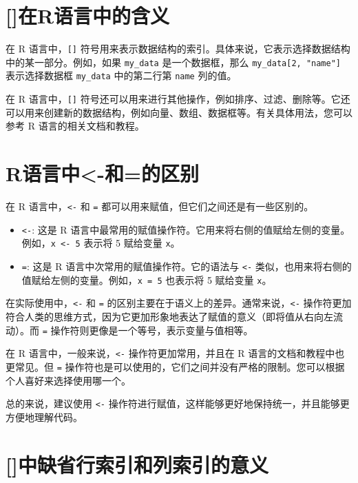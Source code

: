 \documentclass[
  letterpaper,
  DIV=11,
  numbers=noendperiod]{scrreprt}
\providecommand{\tightlist}{%
  \setlength{\itemsep}{0pt}\setlength{\parskip}{0pt}}\usepackage{longtable,booktabs,array}
\begin{document}
\section{{[}{]}在R语言中的含义}\label{ux5728rux8bedux8a00ux4e2dux7684ux542bux4e49}

在 R 语言中，\texttt{{[}{]}}
符号用来表示数据结构的索引。具体来说，它表示选择数据结构中的某一部分。例如，如果
\texttt{my\_data} 是一个数据框，那么 \texttt{my\_data{[}2,\ "name"{]}}
表示选择数据框 \texttt{my\_data} 中的第二行第 \texttt{name} 列的值。

在 R 语言中，\texttt{{[}{]}}
符号还可以用来进行其他操作，例如排序、过滤、删除等。它还可以用来创建新的数据结构，例如向量、数组、数据框等。有关具体用法，您可以参考
R 语言的相关文档和教程。

\section{R语言中\textless-和=的区别}\label{rux8bedux8a00ux4e2d-ux548cux7684ux533aux522b}

在 R 语言中，\texttt{\textless{}-} 和 \texttt{=}
都可以用来赋值，但它们之间还是有一些区别的。

\begin{itemize}
\tightlist
\item
  \texttt{\textless{}-}: 这是 R
  语言中最常用的赋值操作符。它用来将右侧的值赋给左侧的变量。例如，\texttt{x\ \textless{}-\ 5}
  表示将 5 赋给变量 \texttt{x}。
\item
  \texttt{=}: 这是 R 语言中次常用的赋值操作符。它的语法与
  \texttt{\textless{}-}
  类似，也用来将右侧的值赋给左侧的变量。例如，\texttt{x\ =\ 5} 也表示将
  5 赋给变量 \texttt{x}。
\end{itemize}

在实际使用中，\texttt{\textless{}-} 和 \texttt{=}
的区别主要在于语义上的差异。通常来说，\texttt{\textless{}-}
操作符更加符合人类的思维方式，因为它更加形象地表达了赋值的意义（即将值从右向左流动）。而
\texttt{=} 操作符则更像是一个等号，表示变量与值相等。

在 R 语言中，一般来说，\texttt{\textless{}-} 操作符更加常用，并且在 R
语言的文档和教程中也更常见。但 \texttt{=}
操作符也是可以使用的，它们之间并没有严格的限制。您可以根据个人喜好来选择使用哪一个。

总的来说，建议使用 \texttt{\textless{}-}
操作符进行赋值，这样能够更好地保持统一，并且能够更方便地理解代码。

\section{{[}{]}中缺省行索引和列索引的意义}\label{ux4e2dux7f3aux7701ux884cux7d22ux5f15ux548cux5217ux7d22ux5f15ux7684ux610fux4e49}
\end{document}
